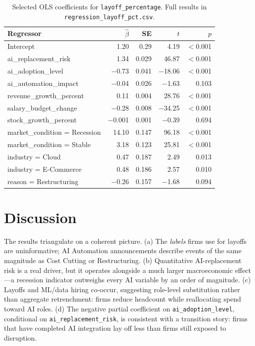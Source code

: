 \documentclass[11pt]{article}
\begin{document}
\begin{table}[htbp]
  \centering
  \caption{Selected OLS coefficients for \texttt{layoff\_percentage}. Full results in \texttt{regression\_layoff\_pct.csv}.}
  \label{tab:reg}
  \begin{tabular}{lrrrr}
    \toprule
    Regressor & $\hat\beta$ & SE & $t$ & $p$ \\
    \midrule
    Intercept & 1.20 & 0.29 & 4.19 & $<$0.001 \\
    ai\_replacement\_risk & 1.34 & 0.029 & 46.87 & $<$0.001 \\
    ai\_adoption\_level & $-$0.73 & 0.041 & $-$18.06 & $<$0.001 \\
    ai\_automation\_impact & $-$0.04 & 0.026 & $-$1.63 & 0.103 \\
    revenue\_growth\_percent & 0.11 & 0.004 & 28.76 & $<$0.001 \\
    salary\_budget\_change & $-$0.28 & 0.008 & $-$34.25 & $<$0.001 \\
    stock\_growth\_percent & $-$0.001 & 0.001 & $-$0.39 & 0.694 \\
    market\_condition = Recession & 14.10 & 0.147 & 96.18 & $<$0.001 \\
    market\_condition = Stable & 3.18 & 0.123 & 25.81 & $<$0.001 \\
    industry = Cloud & 0.47 & 0.187 & 2.49 & 0.013 \\
    industry = E-Commerce & 0.48 & 0.186 & 2.57 & 0.010 \\
    reason = Restructuring & $-$0.26 & 0.157 & $-$1.68 & 0.094 \\
    \bottomrule
  \end{tabular}
\end{table}

\section{Discussion}
The results triangulate on a coherent picture. (a) The \emph{labels} firms use for layoffs are uninformative; AI Automation announcements describe events of the same magnitude as Cost Cutting or Restructuring. (b) Quantitative AI-replacement risk is a real driver, but it operates alongside a much larger macroeconomic effect---a recession indicator outweighs every AI variable by an order of magnitude. (c) Layoffs and ML/data hiring co-occur, suggesting role-level substitution rather than aggregate retrenchment: firms reduce headcount while reallocating spend toward AI roles. (d) The negative partial coefficient on \texttt{ai\_adoption\_level}, conditional on \texttt{ai\_replacement\_risk}, is consistent with a transition story: firms that have completed AI integration lay off less than firms still exposed to disruption.
\end{document}
